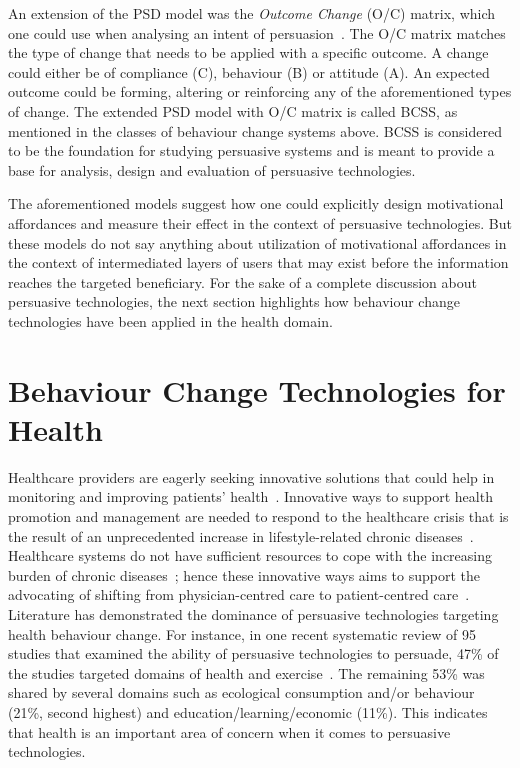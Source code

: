 An extension of the PSD model was the \emph{Outcome Change} (O/C) matrix, which one could use when analysing an intent of persuasion~\citep{Oinas-Kukkonen:foundation}. The O/C matrix matches the type of change that needs to be applied with a specific outcome. A change could either be of compliance (C), behaviour (B)  or attitude (A). An expected outcome could be forming, altering or reinforcing any of the aforementioned types of change. The extended PSD model with O/C matrix is called BCSS, as mentioned in the classes of behaviour change systems above. BCSS is considered to be the foundation for studying persuasive systems and is meant to provide a base for analysis, design and evaluation of persuasive technologies.
 
The aforementioned models suggest how one could explicitly design motivational affordances and measure their effect in the context of persuasive technologies. But these models do not say anything about utilization of motivational affordances in the context of intermediated layers of users that may exist before the information reaches the targeted beneficiary. For the sake of a complete discussion about persuasive technologies, the next section highlights how behaviour change technologies have been applied in the health domain.

\section{Behaviour Change Technologies for Health}
Healthcare providers are eagerly seeking innovative solutions that could help in monitoring and improving patients' health~\citep{higgins2016smartphone}. Innovative ways to support health promotion and management are needed to respond to the healthcare crisis that is the result of an unprecedented increase in lifestyle-related chronic diseases~\citep{arsand:mobile}. Healthcare systems do not have sufficient resources to cope with the increasing burden of chronic diseases~\citep{quinn2008welldoc,arsand:mobile}; hence these innovative ways aims to support the advocating of shifting from physician-centred care to patient-centred care~\citep{higgins2016smartphone,korhonen2010personal}.  Literature has demonstrated the dominance of persuasive technologies targeting health behaviour change. For instance, in one recent systematic review of 95 studies that examined the ability of persuasive technologies to persuade, 47\% of the studies targeted domains of health and exercise~\citep{hamari2014persuasive}. The remaining 53\% was shared by several domains such as ecological consumption and/or behaviour (21\%, second highest) and education/learning/economic (11\%). This indicates that health is an important area of concern when it comes to persuasive technologies.

